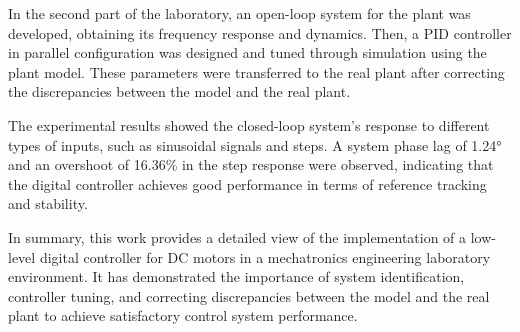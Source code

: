 \documentclass[conference,onecolumn]{IEEEtran}
\begin{document}
In the second part of the laboratory, an open-loop system for the plant was developed, obtaining its frequency response and dynamics. Then, a PID controller in parallel configuration was designed and tuned through simulation using the plant model. These parameters were transferred to the real plant after correcting the discrepancies between the model and the real plant.

The experimental results showed the closed-loop system's response to different types of inputs, such as sinusoidal signals and steps. A system phase lag of 1.24° and an overshoot of 16.36\% in the step response were observed, indicating that the digital controller achieves good performance in terms of reference tracking and stability.

In summary, this work provides a detailed view of the implementation of a low-level digital controller for DC motors in a mechatronics engineering laboratory environment. It has demonstrated the importance of system identification, controller tuning, and correcting discrepancies between the model and the real plant to achieve satisfactory control system performance.
\end{document}
